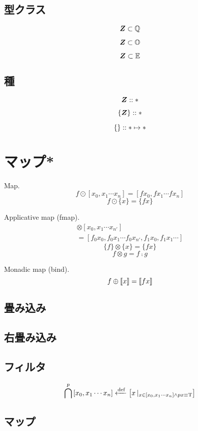\documentclass[twocolumn]{jsbook}
\newcommand{\listtype}[1]{\left[#1\right]}
\newcommand{\guard}[1]{\mathop{\mid_{#1}}}
\begin{document}
\section{型クラス}

$$\bm{Z}\subset\mathbb{Q}$$

$$\bm{Z}\subset\mathbb{O}$$

$$\bm{Z}\subset\mathbb{E}$$


\section{種}

$$\bm{Z}::\mathbf\ast$$

$$\left\{\bm{Z}\right\}::\mathbf\ast$$

$$\left\{{}\right\}::\mathbf\ast\mapsto\mathbf\ast$$

\chapter{マップ*}

Map.
$$f\odot[x_0,x_1\dotsb x_n]=[fx_0,fx_1\dotsb fx_n]$$
$$f\odot\{x\}=\{fx\}$$

Applicative map (fmap).
\begin{multline*}
[f_0,f_1\dotsb f_n]\otimes[x_0,x_1\dotsb x_{n'}]\\
=[f_0x_0,f_0x_1\dotsb f_0x_{n'},f_1x_0,f_1x_1\dotsb]
\end{multline*}
$$\{f\}\otimes\{x\}=\{fx\}$$
$$f\otimes g=f\comp g$$

Monadic map (bind).
$$f\oplus\left[\!\left[x\right]\!\right]=\left[\!\left[fx\right]\!\right]$$


\section{畳み込み}


\section{右畳み込み}


\section{フィルタ}

$$\filterfunc^p\listtype{x_0,x_1\dotsb x_n}\defeq\listtype{x\guard{x\in\listtype{x_0,x_1\dotsb x_n}\wedge px\equiv\truevalue}}$$

\section{マップ}
\end{document}
